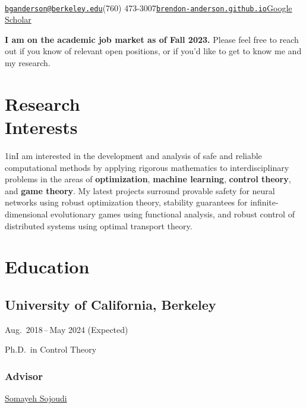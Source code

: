 \documentclass[11pt]{article}
\newcommand{\sectionwidth}{1in}		%
\renewcommand{\maketitle}{%
	\begin{center}
		{\huge\bfseries\theauthor}\\
		\vspace*{1em}%
		{\href{mailto:\theemail}{\texttt{\theemail}}\quad\thephone\quad\href{https://\thewebsite}{\texttt{\thewebsite}}\quad\href{\thescholar}{Google Scholar}}\\
		\vspace*{0em}%
	\end{center}%
}							%
\newcommand{\cvdates}[2]{\hfill#1\,--\,#2}	%
\begin{document}
	
	\title{}
	\date{}
	\author{Brendon G.\ Anderson}
	\newcommand{\theemail}{bganderson@berkeley.edu}
	\newcommand{\thephone}{(760) 473-3007}
	\newcommand{\thewebsite}{brendon-anderson.github.io}
	\newcommand{\thescholar}{https://scholar.google.com/citations?user=-zepUjMAAAAJ&hl=en&oi=ao}
	\maketitle

	\textbf{I am on the academic job market as of Fall 2023.} Please feel free to reach out if you know of relevant open positions, or if you'd like to get to know me and my research.

	\section{\texorpdfstring{Research \\[\baselineskip] Interests}{Research Interests}}
	\hfill\vspace*{-2\baselineskip}

	\begin{adjustwidth}{\sectionwidth}{}I am interested in the development and analysis of safe and reliable computational methods by applying rigorous mathematics to interdisciplinary problems in the areas of \textbf{optimization}, \textbf{machine learning}, \textbf{control theory}, and \textbf{game theory}. My latest projects surround provable safety for neural networks using robust optimization theory, stability guarantees for infinite-dimensional evolutionary games using functional analysis, and robust control of distributed systems using optimal transport theory.\end{adjustwidth}
	
	\section{Education}
	\subsection{University of California, Berkeley}
	\cvdates{Aug.\ 2018}{May 2024 (Expected)}
	
	\hspace*{\sectionwidth}Ph.D.\ in Control Theory
	
	\subsubsection{Advisor}
	\href{https://people.eecs.berkeley.edu/~sojoudi/}{Somayeh Sojoudi}
	
\end{document}
